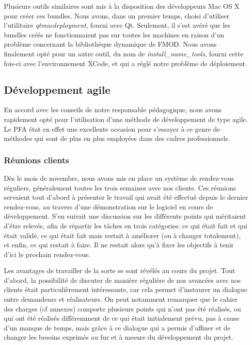 \documentclass[a4paper,11pt]{article}
\begin{document}
Plusieurs outils similaires sont mis à la disposition des développeurs Mac OS X pour créer ces bundles. Nous avons, dans un premier temps, choisi d'utiliser l'utilitaire \textit{qtmacdeployment}, fourni avec Qt. Seulement, il s'est avéré que les bundles créés ne fonctionnaient pas sur toutes les machines en raison d'un problème concernant la bibliothèque dynamique de FMOD. Nous avons finalement opté pour un autre outil, du nom de \textit{install\_name\_tools}, fourni cette fois-ci avec l'environnement XCode, et qui a réglé notre problème de déploiement.

\subsection{Développement agile}

En accord avec les conseils de notre responsable pédagogique, nous avons rapidement opté pour l'utilisation d'une méthode de développement de type agile. Le PFA état en effet une excellente occasion pour s'essayer à ce genre de méthodes qui sont de plus en plus employées dans des cadres professionnels.

\subsubsection{Réunions clients}

Dès le mois de novembre, nous avons mis en place un système de rendez-vous réguliers, généralement toutes les trois semaines avec nos clients. Ces réunions servaient tout d'abord à présenter le travail qui avait été effectué depuis le dernier rendez-vous, au travers d'une démonstration sur le logiciel en cours de développement. S'en suivait une discussion sur les différents points qui méritaient d'être relevés, afin de répartir les tâches en trois catégories: ce qui était fait et qui était validé, ce qui était fait mais restait à améliorer (ou à changer totalement), et enfin, ce qui restait à faire. Il ne restait alors qu'à fixer les objectifs à tenir d'ici le prochain rendez-vous.

Les avantages de travailler de la sorte se sont révélés au cours du projet. Tout d'abord, la possibilité de discuter de manière régulière de nos avancées avec nos clients était particulièrement intéressante, car cela permet d'instaurer un dialogue entre demandeurs et réalisateurs. On peut notamment remarquer que le cahier des charges (cf annexes) comporte plusieurs points qui n'ont pas été réalisés, ou qui ont été réalisés différemment de ce qui était initialement prévu, pas à cause d'un manque de temps, mais grâce à ce dialogue qui a permis d'affiner et de changer les besoins exprimés au fur et à mesure du développement du projet.
\end{document}
